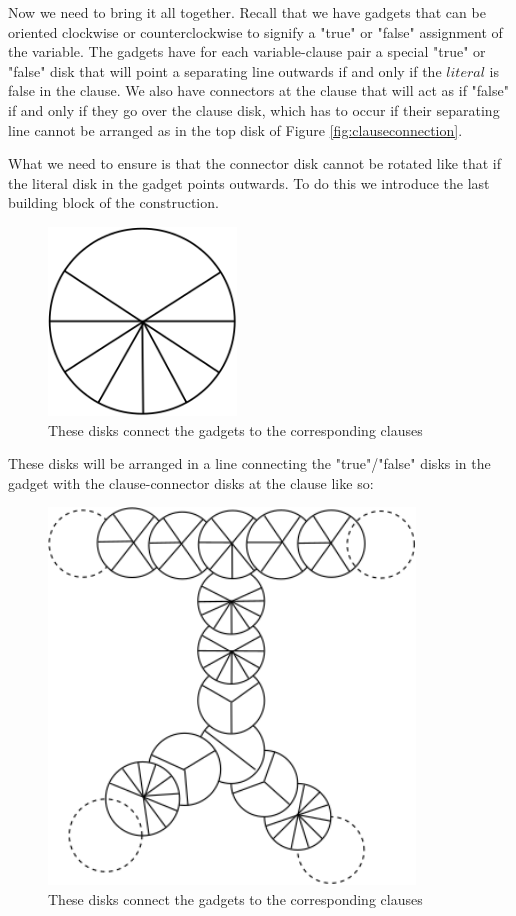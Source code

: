 \documentclass[a4paper,11pt]{article}
\begin{document}
Now we need to bring it all together. Recall that we have gadgets that can be oriented clockwise or counterclockwise to signify a "true" or "false" assignment of the variable. The gadgets have for each variable-clause pair a special "true" or "false" disk that will point a separating line outwards if and only if the $literal$ is false in the clause. We also have connectors at the clause that will act as if "false" if and only if they go over the clause disk, which has to occur if their separating line cannot be arranged as in the top disk of Figure \ref{fig:clauseconnection}.

What we need to ensure is that the connector disk cannot be rotated like that if the literal disk in the gadget points outwards. To do this we introduce the last building block of the construction.

\begin{figure}[h]
  \centering
  \includegraphics[height=5cm]{assets/np-hardness/literal_connector.png}
  \caption{These disks connect the gadgets to the corresponding clauses}
\end{figure}

These disks will be arranged in a line connecting the "true"/"false" disks in the gadget with the clause-connector disks at the clause like so:

\begin{figure}[h]
  \centering
  \includegraphics[height=10cm]{assets/np-hardness/full.png}
  \caption{These disks connect the gadgets to the corresponding clauses}
\end{figure}
\end{document}
